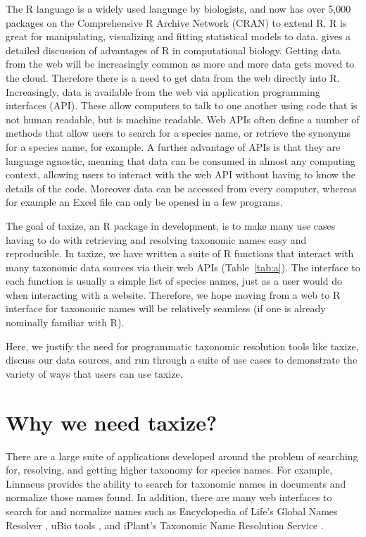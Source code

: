 \documentclass[10pt]{article}\usepackage[]{graphicx}\usepackage[]{color}
\begin{document}
The R language is a widely used language by biologists, and now has over 5,000 packages on the Comprehensive R Archive Network (CRAN) to extend R. R is great for manipulating, visualizing and fitting statistical models to data. \cite{gentleman_bioconductor:_2004} gives a detailed discussion of advantages of R in computational biology. Getting data from the web will be increasingly common as more and more data gets moved to the cloud. Therefore there is a need to get data from the web directly into R. Increasingly, data is available from the web via application programming interfaces (API). These allow computers to talk to one another using code that is not human readable, but is machine readable. Web APIs often define a number of methods that allow users to search for a species name, or retrieve the synonyms for a species name, for example. A further advantage of APIs is that they are language agnostic, meaning that data can be consumed in almost any computing context, allowing users to interact with the web API without having to know the details of the code. Moreover data can be accessed from every computer, whereas for example an Excel file can only be opened in a few programs. 

The goal of taxize, an R package in development, is to make many use cases having to do with retrieving and resolving taxonomic names easy and reproducible. In taxize, we have written a suite of R functions that interact with many taxonomic data sources via their web APIs (Table~\ref{tab:a}). The interface to each function is usually a simple list of species names, just as a user would do when interacting with a website. Therefore, we hope moving from a web to R interface for taxonomic names will be relatively seamless (if one is already nominally familiar with R). 

Here, we justify the need for programmatic taxonomic resolution tools like taxize, discuss our data sources, and run through a suite of use cases to demonstrate the variety of ways that users can use taxize.


\section*{Why we need taxize?}

There are a large suite of applications developed around the problem of searching for, resolving, and getting higher taxonomy for species names. For example, Linnaeus \cite{linnaeus} provides the ability to search for taxonomic names in documents and normalize those names found. In addition, there are many web interfaces to search for and normalize names such as Encyclopedia of Life's Global Names Resolver \cite{eolgnr}, uBio tools \cite{ubio}, and iPlant's Taxonomic Name Resolution Service \cite{tnrs}. 
\end{document}
